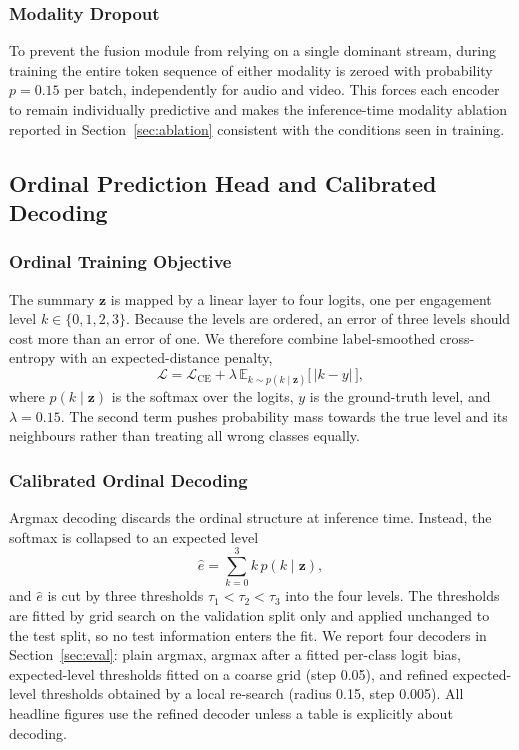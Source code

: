 \documentclass[journal]{IEEEtran}
\begin{document}
\subsubsection{Modality Dropout}
To prevent the fusion module from relying on a single dominant stream, during training the entire token sequence of either modality is zeroed with probability $p = 0.15$ per batch, independently for audio and video. This forces each encoder to remain individually predictive and makes the inference-time modality ablation reported in Section~\ref{sec:ablation} consistent with the conditions seen in training.

\subsection{Ordinal Prediction Head and Calibrated Decoding}

\subsubsection{Ordinal Training Objective}
The summary $\mathbf{z}$ is mapped by a linear layer to four logits, one per engagement level $k \in \{0,1,2,3\}$. Because the levels are ordered, an error of three levels should cost more than an error of one. We therefore combine label-smoothed cross-entropy with an expected-distance penalty,
\begin{equation}
\mathcal{L} = \mathcal{L}_{\mathrm{CE}} + \lambda \, \mathbb{E}_{k \sim p(k \mid \mathbf{z})}\big[\,|k - y|\,\big],
\end{equation}
where $p(k \mid \mathbf{z})$ is the softmax over the logits, $y$ is the ground-truth level, and $\lambda = 0.15$. The second term pushes probability mass towards the true level and its neighbours rather than treating all wrong classes equally.

\subsubsection{Calibrated Ordinal Decoding}
Argmax decoding discards the ordinal structure at inference time. Instead, the softmax is collapsed to an expected level
\begin{equation}
\hat{e} = \sum_{k=0}^{3} k \, p(k \mid \mathbf{z}),
\end{equation}
and $\hat{e}$ is cut by three thresholds $\tau_1 < \tau_2 < \tau_3$ into the four levels. The thresholds are fitted by grid search on the validation split only and applied unchanged to the test split, so no test information enters the fit. We report four decoders in Section~\ref{sec:eval}: plain argmax, argmax after a fitted per-class logit bias, expected-level thresholds fitted on a coarse grid (step 0.05), and refined expected-level thresholds obtained by a local re-search (radius 0.15, step 0.005). All headline figures use the refined decoder unless a table is explicitly about decoding.
\end{document}
